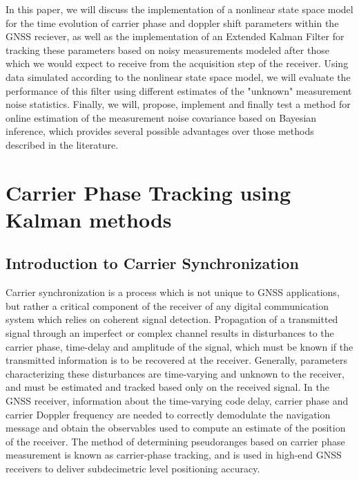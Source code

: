 \documentclass[11pt]{article}
\begin{document}
In this paper, we will discuss the implementation of a nonlinear state space model for the time evolution of carrier phase and doppler shift parameters within the GNSS reciever, as well as the implementation of an Extended Kalman Filter for tracking these parameters based on noisy measurements modeled after those which we would expect to receive from the acquisition step of the receiver. Using data simulated according to the nonlinear state space model, we will evaluate the performance of this filter using different estimates of the "unknown" measurement noise statistics. Finally, we will, propose, implement and finally test a method for online estimation of the measurement noise covariance based on Bayesian inference, which provides several possible advantages over those methods described in the literature.


\section{Carrier Phase Tracking using Kalman methods}

\subsection{Introduction to Carrier Synchronization}

Carrier synchronization is a process which is not unique to GNSS applications, but rather a critical component of the receiver of any digital communication system which relies on coherent signal detection. Propagation of a transmitted signal through an imperfect or complex channel results in disturbances to the carrier phase, time-delay and amplitude of the signal, which must be known if the transmitted information is to be recovered at the receiver. Generally, parameters characterizing these disturbances are time-varying and unknown to the receiver, and must be estimated and tracked based only on the received signal. In the GNSS receiver, information about the time-varying code delay, carrier phase and carrier Doppler frequency are needed to correctly demodulate the navigation message and obtain the observables used to compute an estimate of the position of the receiver. The method of determining pseudoranges based on carrier phase measurement is known as carrier-phase tracking, and is used in high-end GNSS receivers to deliver subdecimetric level positioning accuracy.
\end{document}
